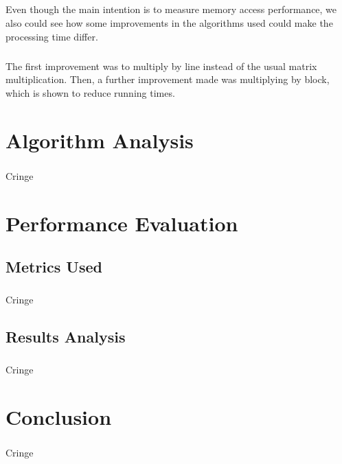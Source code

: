 \documentclass{report}
\begin{document}
    \paragraph{}Even though the main intention is to measure memory access performance, we also could see how some improvements in the algorithms used could make the processing time differ.

    \paragraph{}The first improvement was to multiply by line instead of the usual matrix multiplication. Then, a further improvement made was multiplying by block, which is shown to reduce running times.

    \chapter{Algorithm Analysis}

    \paragraph{}Cringe

    \chapter{Performance Evaluation}

    \section{Metrics Used}

    \paragraph{}Cringe

    \section{Results Analysis}

    \paragraph{}Cringe

    \chapter{Conclusion}

    \paragraph{}Cringe
\end{document}
